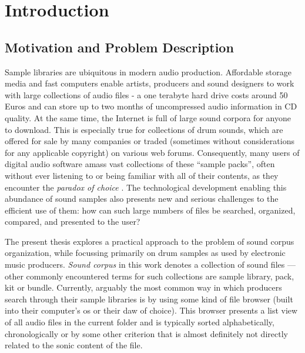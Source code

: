 
\section{Introduction}
\label{sec:introduction}

\subsection{Motivation and Problem Description}
\label{subsec:motivation}
Sample libraries are ubiquitous in modern audio production. Affordable storage
media and fast computers enable artists, producers and sound designers to work
with large collections of audio files - a one terabyte hard drive costs around
50 Euros and can store up to two months of uncompressed audio information in CD
quality. At the same time, the Internet is full of large sound corpora for
anyone to download. This is especially true for collections of drum sounds,
which are offered for sale by many companies or traded (sometimes without
considerations for any applicable copyright) on various web forums.
Consequently, many users of digital audio software amass vast collections of
these ``sample packs'', often without ever listening to or being familiar with
all of their contents, as they encounter the \textit{paradox of choice}
\citep{schwartz2004}. The technological development enabling this abundance of
sound samples also presents new and serious challenges to the efficient use of
them: how can such large numbers of files be searched, organized, compared, and
presented to the user?

\bigskip

The present thesis explores a practical approach to the problem of sound corpus
organization, while focussing primarily on drum samples as used by electronic
music producers. \textit{Sound corpus} in this work denotes a collection of
sound files --- other commonly encountered terms for such collections are sample
library, pack, kit or bundle. Currently, arguably the most common way in which
producers search through their sample libraries is by using some kind of file
browser (built into their computer's \gls{os} or their \gls{daw} of choice).
This browser presents a list view of all audio files in the current folder and
is typically sorted alphabetically, chronologically or by some other criterion
that is almost definitely not directly related to the sonic content of the file.

\smallskip

